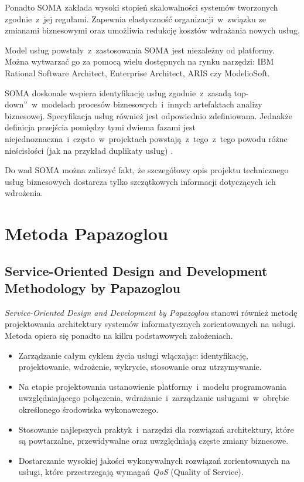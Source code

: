 Ponadto SOMA zakłada wysoki stopień skalowalności systemów tworzonych zgodnie~z~jej regułami. Zapewnia elastyczność organizacji~w~związku ze zmianami biznesowymi oraz umożliwia redukcję kosztów wdrażania nowych usług.

Model usług powstały~z~zastosowania SOMA jest niezależny od platformy. Można wytwarzać go za pomocą wielu dostępnych na rynku narzędzi: IBM Rational Software Architect, Enterprise Architect, ARIS czy ModelioSoft.

SOMA doskonale wspiera identyfikację usług zgodnie~z~zasadą \quotedblbase top-down\textquotedblright~w~modelach procesów biznesowych~i~innych artefaktach analizy biznesowej. Specyfikacja usług również jest odpowiednio zdefiniowana. Jednakże definicja przejścia pomiędzy tymi dwiema fazami jest niejednoznaczna~i~często~w~projektach powstają~z~tego~z~tego powodu różne nieścisłości (jak na przykład duplikaty usług) \cite{MicMetZIMM}. 

Do wad SOMA można zaliczyć fakt, że szczegółowy opis projektu technicznego usług biznesowych dostarcza tylko szczątkowych informacji dotyczących ich wdrożenia. 


\section{Metoda Papazoglou}
\subsection{Service-Oriented Design and Development Methodology by Papazoglou}
\emph{Service-Oriented Design and Development by Papazoglou} stanowi również metodę projektowania architektury systemów informatycznych zorientowanych na usługi. Metoda opiera się ponadto na kilku podstawowych założeniach.
\begin{itemize}
\item{Zarządzanie całym cyklem życia usługi włączając: identyfikację, projektowanie, wdrożenie, wykrycie, stosowanie oraz utrzymywanie.}
\item{Na etapie projektowania ustanowienie platformy~i~modelu programowania uwzględniającego połączenia, wdrażanie~i~zarządzanie usługami~w~obrębie określonego środowiska wykonawczego.}
\item{Stosowanie najlepszych praktyk~i~narzędzi dla rozwiązań architektury, które są powtarzalne, przewidywalne oraz uwzględniają częste zmiany biznesowe.}
\item{Dostarczanie wysokiej jakości wykonywalnych rozwiązań zorientowanych na usługi, które przestrzegają wymagań \emph{QoS} (Quality of Service)}.
\end{itemize}

